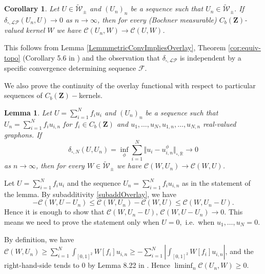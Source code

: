 \documentclass[11pt]{article}
\newtheorem{corollary}{Corollary}[theorem]
\newtheorem{lemma}[theorem]{Lemma}
\def\R{\mathbb{R}}
\newcommand{\cF}{{\mathcal F}}  %
\newcommand{\Space}{\mathbf{Z}}
\newcommand{\signed}{\pm}
\newcommand{\CbFunct}{C_b(\Space)}
\newcommand{\UKernel}{\widetilde{\mathcal{W}}_{\signed}}
\newcommand{\NcutR}[1]{\Vert#1\Vert_{\square,\R}}
\begin{document}
\begin{corollary}\label{CorSequencesEqOv}
 Let $U \in \UKernel$ and $(U_n)_n$ be a sequence such that $U_n\in \UKernel.$ If $\delta_{\square,\mathcal{LP}}\left(U_n, U\right) \rightarrow 0$ as $n \rightarrow \infty$, then for every (Bochner measurable) $\CbFunct$-valued kernel $W$ we have $\mathcal{C}\left(U_n, W\right) \rightarrow \mathcal{C}(U, W)$.
\end{corollary}
\proof
This follows from Lemma \ref{LemmmetricConvImpliesOverlay}, Theorem \ref{cor:equiv-topo} (Corollary 5.6 in \cite{abraham2023probabilitygraphons}) and the observation that $\delta_{\square,\mathcal{LP}}$ is independent by a specific convergence determining sequence $\cF.$
\endproof

We also prove the continuity of the overlay functional with respect to particular sequences of $\CbFunct-$kernels.

\begin{lemma}
   \label{continuityContBoundGraphRealValCutDist}
   Let $U=\sum^N_{i=1}f_iu_{i}$ and $(U_n)_n$ be a sequence such that $U_n=\sum^N_{i=1}f_iu_{i,n}$ for $f_i\in \CbFunct$ and $u_1,\ldots,u_N,u_{1,n},\ldots,u_{N,n}$ real-valued graphons. If \begin{equation}\label{Eq:CutmetricFiniteCb}
    \delta_{\square,N}(U,U_n)=\inf_{\phi}\sum^N_{i=1}\NcutR{u_i-u^\phi_{i,n}}\rightarrow0
\end{equation} as $n \rightarrow \infty$, then for every $W \in\UKernel$ we have $\mathcal{C}\left( W,U_n\right) \rightarrow \mathcal{C}(W,U)$.
\end{lemma}



\proof
Let $U=\sum^N_{i=1}f_iu_{i}$ and the sequence $U_n=\sum^N_{i=1}f_iu_{i,n}$ as in the statement of the lemma.
By subadditivity \eqref{subaddOverlay}, we have
$$
 -\mathcal{C}\left(W,U-U_n \right) \leq \mathcal{C}\left(W,U_n\right)-\mathcal{C}(W,U) \leq \mathcal{C}\left(W,U_n-U\right).
$$
Hence it is enough to show that $\mathcal{C}\left(W,U_n-U\right)$, $\mathcal{C}\left(W,U-U_n\right) \rightarrow 0$. This means we need to prove the statement only when $U=0,$ i.e.\ when $u_1,\ldots,u_N=0.$

By definition, we have $\mathcal{C}(W,U_n)\geq \sum^N_{i=1}\int_{[0,1]^{2}}W[f_i]u_{i,n}\geq-\sum^N_{i=1}\left|\int_{[0,1]^{2}}W[f_i]u_{i,n} \right|$, and the right-hand-side tends to $0$ by Lemma 8.22 in \cite{LovaszGraphLimits}. Hence $\liminf_n\mathcal{C}(U_n,W)\geq 0.$\newline
\end{document}
